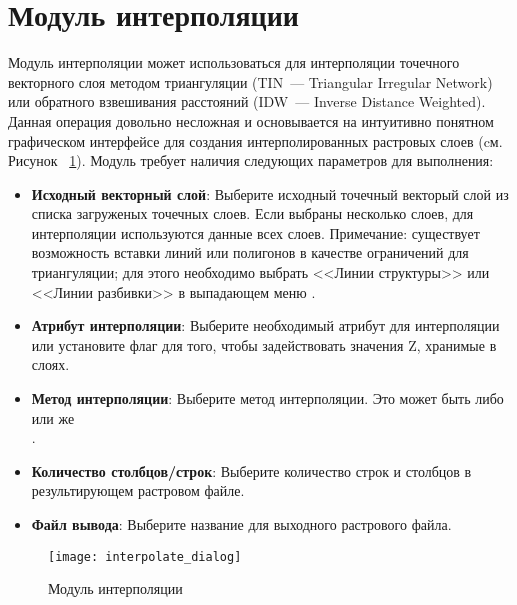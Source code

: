 
\section{Модуль интерполяции}


Модуль интерполяции может использоваться для интерполяции точечного векторного слоя
методом триангуляции (TIN~--- Triangular Irregular
Network) или обратного взвешивания расстояний (IDW~--- Inverse Distance
Weighted). Данная операция довольно несложная и основывается на интуитивно понятном графическом
интерфейсе для создания интерполированных растровых слоев (cм. Рисунок~
\ref{fig:interpolation_dialog}). Модуль требует наличия следующих
параметров для выполнения:

\begin{itemize}[label=--]
\item \textbf{Исходный векторный слой}: Выберите исходный точечный
векторый слой из списка загруженых точечных слоев. Если выбраны
несколько слоев, для интерполяции используются данные всех слоев.
Примечание: существует возможность вставки линий или полигонов в
качестве ограничений для триангуляции; для этого необходимо выбрать
<<Линии структуры>> или <<Линии разбивки>> в выпадающем меню
.
\item \textbf{Атрибут интерполяции}: Выберите необходимый атрибут
для интерполяции или установите флаг
 для того, чтобы
задействовать значения Z, хранимые в слоях.
\item \textbf{Метод интерполяции}: Выберите метод интерполяции. Это
может быть либо \\
 или же \\
.
\item \textbf{Количество столбцов/строк}: Выберите количество строк и
столбцов в результирующем растровом файле.
\item \textbf{Файл вывода}: Выберите название для выходного растрового
файла.
\end{itemize}

\begin{figure}[ht]
   \centering
   \texttt{[image: interpolate\_dialog]}
   \caption{Модуль интерполяции \wincaption}\label{fig:interpolation_dialog}
\end{figure}

